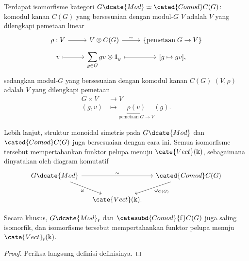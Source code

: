 \begin{proposition}\label{prop:Rep-comod-fiber}
	Terdapat isomorfisme kategori
	$G\dcate{Mod} \simeq \cated{Comod}C(G)$: komodul kanan $C(G)$ yang
	bersesuaian dengan modul-$G$ $V$ adalah $V$ yang dilengkapi pemetaan linear
	\[\begin{tikzcd}[row sep=tiny]
		\rho: V \arrow[r] & V \otimes C(G) \arrow[r, "\sim"] & \left\{\text{pemetaan}\; G \to V \right\} \\
		v \arrow[mapsto, r] & \displaystyle\sum_{g \in G} gv \otimes \mathbf{1}_g \arrow[mapsto, r] & {[g \mapsto gv]},
	\end{tikzcd}\]
	sedangkan modul-$G$ yang bersesuaian dengan komodul kanan $C(G)$ $(V, \rho)$ adalah $V$ yang dilengkapi pemetaan
	\begin{align*}
		G \times V & \to V \\
		(g, v) & \mapsto \underbracket{\rho(v)}_{\text{pemetaan}\; G \to V}(g).
	\end{align*}

	Lebih lanjut, struktur monoidal simetris pada $G\dcate{Mod}$ dan $\cated{Comod}C(G)$ juga bersesuaian dengan cara ini. Semua isomorfisme tersebut mempertahankan funktor pelupa menuju $\cate{Vect}(\Bbbk)$, sebagaimana dinyatakan oleh diagram komutatif
	\[\begin{tikzcd}[column sep=small]
		G\dcate{Mod} \arrow[rr, "\sim"] \arrow[rd, "\omega"'] & & \cated{Comod}C(G) \arrow[ld, "{\omega_{C(G)}}"] \\
		& \cate{Vect}(\Bbbk). &
	\end{tikzcd}\]

	Secara khusus, $G\dcate{Mod}_{\mathrm{f}}$ dan $\catesubd{Comod}{\mathrm{f}}C(G)$ juga saling isomorfik, dan isomorfisme tersebut mempertahankan funktor pelupa menuju $\cate{Vect}_{\mathrm{f}}(\Bbbk)$.
\end{proposition}
\begin{proof}
	Periksa langsung definisi-definisinya.
\end{proof}

